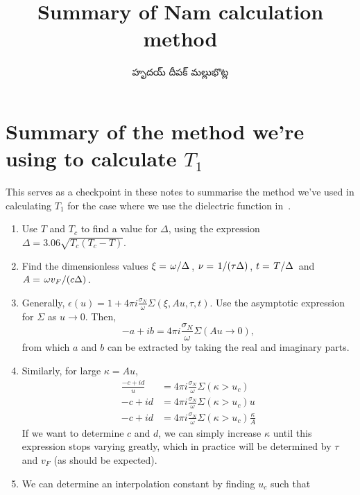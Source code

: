 \documentclass[../main.tex]{subfiles}
\title{Summary of Nam calculation method}
\author{\begin{telugu}హృదయ్ దీపక్ మల్లుభొట్ల\end{telugu}}
\date{}
\begin{document}
	\graphicspath{{\main/figures/}}

	\onlyinsubfile{\maketitle}

	\section{Summary of the method we're using to calculate \texorpdfstring{$T_1$}{T1}} \label{sec:overallsummary:norm}

	This serves as a checkpoint in these notes to summarise the method we've used in calculating $T_{1}$ for the case where we use the dielectric function in~\cite{Nam1967}.

	\begin{enumerate}
		\item Use $T$ and $T_c$ to find a value for $\Delta$, using the expression $\Delta = 3.06 \sqrt{T_c(T_c - T)}$.
		\item Find the dimensionless values $\xi = \flatfrac{\omega}{\Delta}$, $\nu = \flatfrac{1}{(\tau \Delta)}$,  $t = \flatfrac{T}{\Delta}$ and $A = \flatfrac{\omega v_F}{(c \Delta)}$.
		\item Generally, $\epsilon(u) = 1 + 4 \pi i \frac{\sigma_N}{\omega} \Sigma(\xi, A u, \tau, t)$.
		Use the asymptotic expression for $\Sigma$ as $u \rightarrow 0$.
		Then,
		\begin{equation}
			-a + ib = 4 \pi i \frac{\sigma_N}{\omega} \Sigma(A u \rightarrow 0),
		\end{equation}
		from which $a$ and $b$ can be extracted by taking the real and imaginary parts.
		\item Similarly, for large $\kappa = A u$,
		\begin{align}
			\frac{-c + i d}{u} &= 4 \pi i \frac{\sigma_N}{\omega} \Sigma(\kappa > u_c) \\
			- c + i d &= 4 \pi i \frac{\sigma_N}{\omega} \Sigma(\kappa > u_c) u \\
			- c + i d &= 4 \pi i \frac{\sigma_N}{\omega} \Sigma(\kappa > u_c) \frac{\kappa}{A}
		\end{align}
		If we want to determine $c$ and $d$, we can simply increase $\kappa$ until this expression stops varying greatly, which in practice will be determined by $\tau$ and $v_F$ (as should be expected).
		\item We can determine an interpolation constant by finding $u_c$ such that
		\begin{align}

\end{align}
\end{enumerate}
\end{document}
